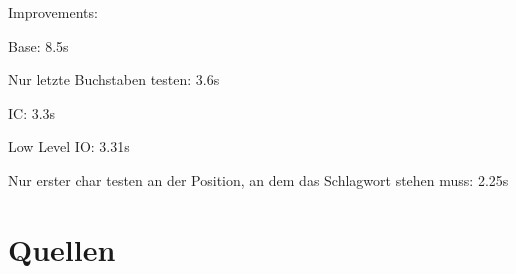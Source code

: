 \documentclass[ngerman, a4paper, footsepline, headsepline, numbers=noenddot]{scrreport}
\begin{document}
	Improvements:
	
	Base: 8.5s
	
	Nur letzte Buchstaben testen: 3.6s
	
	IC: 3.3s
	
	Low Level IO: 3.31s
	
	Nur erster char testen an der Position, an dem das Schlagwort stehen muss: 2.25s 
	
	
	\chapter{Quellen}
	
	
	
	
	
	
\end{document}
